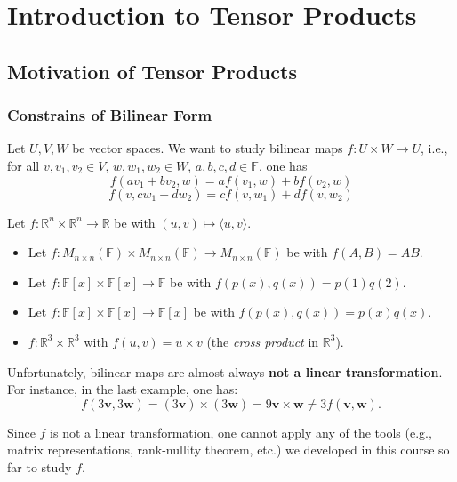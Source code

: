 \chapter{Introduction to Tensor Products}

\section{Motivation of Tensor Products}
\subsection{Constrains of Bilinear Form}
Let \( U, V, W \) be vector spaces. We want to study bilinear maps \( f : U \times W \to U \), i.e., for all \( v, v_1, v_2 \in V \), \( w, w_1, w_2 \in W \), \( a, b, c, d \in \mathbb{F} \), one has
\[
f(av_1 + bv_2, w) = a f(v_1, w) + b f(v_2, w)
\]
\[
f(v, cw_1 + dw_2) = c f(v, w_1) + d f(v, w_2)
\]

\begin{example}
Let \( f : \mathbb{R}^n \times \mathbb{R}^n \to \mathbb{R} \) be with \( (u, v) \mapsto \langle u, v \rangle \).

\begin{itemize}
    \item Let \( f : M_{n \times n}(\mathbb{F}) \times M_{n \times n}(\mathbb{F}) \to M_{n \times n}(\mathbb{F}) \) be with \( f(A, B) = AB \).
    
    \item Let \( f : \mathbb{F}[x] \times \mathbb{F}[x] \to \mathbb{F} \) be with \( f(p(x), q(x)) = p(1) q(2) \).
    
    \item Let \( f : \mathbb{F}[x] \times \mathbb{F}[x] \to \mathbb{F}[x] \) be with \( f(p(x), q(x)) = p(x) q(x) \).
    
    \item \( f : \mathbb{R}^3 \times \mathbb{R}^3 \) with \( f(u, v) = u \times v \) (the \emph{cross product} in \( \mathbb{R}^3 \)).
\end{itemize}
\end{example}

\noindent Unfortunately, bilinear maps are almost always \textbf{not a linear transformation}. For instance, in the last example, one has:
\[
f(3 \mathbf{v}, 3 \mathbf{w}) = (3 \mathbf{v}) \times (3 \mathbf{w}) = 9 \mathbf{v} \times \mathbf{w} \neq 3 f(\mathbf{v}, \mathbf{w}).
\]

Since \( f \) is not a linear transformation, one cannot apply any of the tools (e.g., matrix representations, rank-nullity theorem, etc.) we developed in this course so far to study \( f \).

